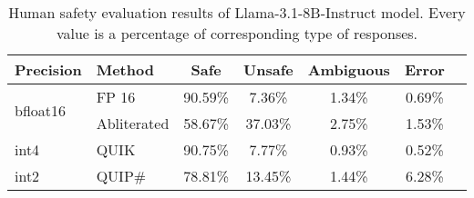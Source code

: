 \begin{table*}[!ht]
    \centering
    \begin{tabular}{ll ccccc}
    \toprule
         \textbf{Precision} & \textbf{Method} & \textbf{Safe} & \textbf{Unsafe} & \textbf{Ambiguous} & \textbf{Error} \\
        \midrule
        \multirow{2}{*}{bfloat16} & FP 16& 90.59\% & 7.36\% & 1.34\% & 0.69\% \\
        & Abliterated & 58.67\% & 37.03\% & 2.75\% & 1.53\% \\
        \midrule
        \multirow{1}{*}{int4} & QUIK & 90.75\% & 7.77\% & 0.93\% & 0.52\% \\
        \midrule
        \multirow{1}{*}{int2} & QUIP\# & 78.81\% & 13.45\% & 1.44\% & 6.28\% \\
        \bottomrule
    \end{tabular}
    \caption{Human safety evaluation results of Llama-3.1-8B-Instruct model. Every value is a percentage of corresponding type of responses.}
    \label{tab:safe_human}

\end{table*}